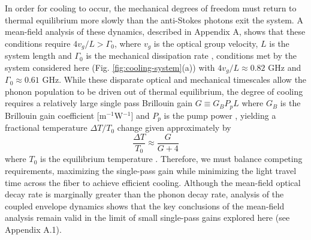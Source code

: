 In order for cooling to occur, the mechanical degrees of freedom must return to thermal equilibrium more slowly than the anti-Stokes photons exit the system. A mean-field analysis of these dynamics, described in Appendix A, shows that these conditions require $4v_g/L > \Gamma_0$, where $v_g$ is the optical group velocity, $L$ is the system length and $\Gamma_0$ is the mechanical dissipation rate \citep{otterstrom2018optomechanical}, conditions met by the system considered here (Fig. \ref{fig:cooling-system}(a)) with $4 v_g/L \approx 0.82$ GHz and $\Gamma_0 \approx 0.61$ GHz. While these disparate optical and mechanical timescales allow the phonon population to be driven out of thermal equilibrium, the degree of cooling requires a relatively large single pass Brillouin gain $G \equiv G_B P_p L$ where $G_B$ is the Brillouin gain coefficient [m$^{-1}$W$^{-1}$] and $P_p$ is the pump power \citep{boyd2020nonlinear}, yielding a fractional temperature $\Delta T/T_0$ change given approximately by
\begin{equation}
\label{eq:FFC}
   \frac{\Delta T}{T_0} \approx \frac{G}{G+4}
\end{equation}
where $T_0$ is the equilibrium temperature \citep{otterstrom2018optomechanical}. Therefore, we must balance competing requirements, maximizing the single-pass gain while minimizing the light travel time across the fiber to achieve efficient cooling. Although the mean-field optical decay rate is marginally greater than the phonon decay rate, analysis of the coupled envelope dynamics shows that the key conclusions of the mean-field analysis remain valid in the limit of small single-pass gains explored here (see Appendix A.1).

